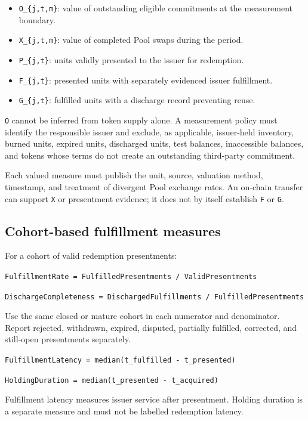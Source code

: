 \documentclass[11pt]{article}
\begin{document}
\begin{itemize}[leftmargin=*]
\item \texttt{O\_\{j,t,m\}}: value of outstanding eligible commitments at the measurement boundary.
\item \texttt{X\_\{j,t,m\}}: value of completed Pool swaps during the period.
\item \texttt{P\_\{j,t\}}: units validly presented to the issuer for redemption.
\item \texttt{F\_\{j,t\}}: presented units with separately evidenced issuer fulfillment.
\item \texttt{G\_\{j,t\}}: fulfilled units with a discharge record preventing reuse.
\end{itemize}
\texttt{O} cannot be inferred from token supply alone. A measurement policy must identify the responsible issuer and exclude, as applicable, issuer-held inventory, burned units, expired units, discharged units, test balances, inaccessible balances, and tokens whose terms do not create an outstanding third-party commitment.

Each valued measure must publish the unit, source, valuation method, timestamp, and treatment of divergent Pool exchange rates. An on-chain transfer can support \texttt{X} or presentment evidence; it does not by itself establish \texttt{F} or \texttt{G}.

\subsection*{Cohort-based fulfillment measures}

For a cohort of valid redemption presentments:

\texttt{FulfillmentRate = FulfilledPresentments / ValidPresentments}

\texttt{DischargeCompleteness = DischargedFulfillments / FulfilledPresentments}

Use the same closed or mature cohort in each numerator and denominator. Report rejected, withdrawn, expired, disputed, partially fulfilled, corrected, and still-open presentments separately.

\texttt{FulfillmentLatency = median(t\_fulfilled - t\_presented)}

\texttt{HoldingDuration = median(t\_presented - t\_acquired)}

Fulfillment latency measures issuer service after presentment. Holding duration is a separate measure and must not be labelled redemption latency.
\end{document}
